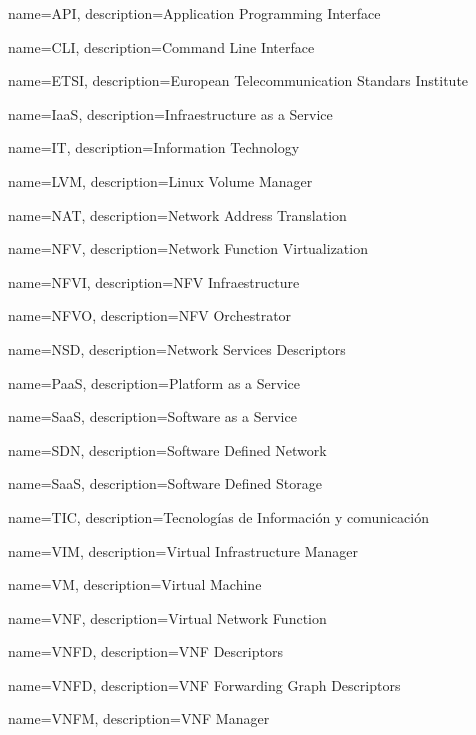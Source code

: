 {
    name=API,
    description={Application Programming Interface}
}

{
    name=CLI,
    description={Command Line Interface}
}

{
    name=ETSI,
    description={European Telecommunication Standars Institute}
}

{
    name=IaaS,
    description={Infraestructure as a Service}
}

{
    name=IT,
    description={Information Technology}
}

{
    name=LVM,
    description={Linux Volume Manager}
}

{
    name=NAT,
    description={Network Address Translation}
}


{
    name=NFV,
    description={Network Function Virtualization}
}

{
    name=NFVI,
    description={NFV Infraestructure}
}

{
    name=NFVO,
    description={NFV Orchestrator}
}

{
    name=NSD,
    description={Network Services Descriptors}
}


{
    name=PaaS,
    description={Platform as a Service}
}


{
    name=SaaS,
    description={Software as a Service}
}

{
    name=SDN,
    description={Software Defined Network}
}


{
    name=SaaS,
    description={Software Defined Storage}
}

{
    name=TIC,
    description={Tecnologías de Información y comunicación}
}


{
    name=VIM,
    description={Virtual Infrastructure Manager}
}


{
    name=VM,
    description={Virtual Machine}
}


{
    name=VNF,
    description={Virtual Network Function}
}

{
    name=VNFD,
    description={VNF Descriptors}
}

{
    name=VNFD,
    description={VNF Forwarding Graph Descriptors}
}

{
    name=VNFM,
    description={VNF Manager}
}


\printglossary